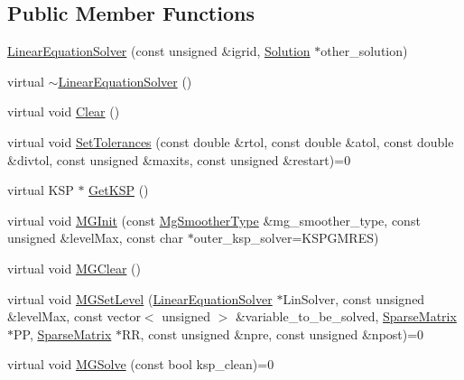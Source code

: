 \subsection*{Public Member Functions}
\begin{DoxyCompactItemize}
\item 
\mbox{\hyperlink{classfemus_1_1_linear_equation_solver_afa8a2758d8652ab34789d9e9d06251fa}{Linear\+Equation\+Solver}} (const unsigned \&igrid, \mbox{\hyperlink{classfemus_1_1_solution}{Solution}} $\ast$other\+\_\+solution)
\item 
virtual \mbox{\hyperlink{classfemus_1_1_linear_equation_solver_aabf62de40b3bc08e5f900130ff341530}{$\sim$\+Linear\+Equation\+Solver}} ()
\item 
virtual void \mbox{\hyperlink{classfemus_1_1_linear_equation_solver_a81ebc19b503dbfc0620f2ca80c1406fa}{Clear}} ()
\item 
virtual void \mbox{\hyperlink{classfemus_1_1_linear_equation_solver_a84b5077395317b5e7201652a68aecb94}{Set\+Tolerances}} (const double \&rtol, const double \&atol, const double \&divtol, const unsigned \&maxits, const unsigned \&restart)=0
\item 
virtual K\+SP $\ast$ \mbox{\hyperlink{classfemus_1_1_linear_equation_solver_a6afe565c3fe3603d79c53529c61f7871}{Get\+K\+SP}} ()
\item 
virtual void \mbox{\hyperlink{classfemus_1_1_linear_equation_solver_a242c687c8b057b1da3136300d530b31e}{M\+G\+Init}} (const \mbox{\hyperlink{_mg_type_enum_8hpp_aec11e12c1f11a6ad959d3280ae0ee9a8}{Mg\+Smoother\+Type}} \&mg\+\_\+smoother\+\_\+type, const unsigned \&level\+Max, const char $\ast$outer\+\_\+ksp\+\_\+solver=K\+S\+P\+G\+M\+R\+ES)
\item 
virtual void \mbox{\hyperlink{classfemus_1_1_linear_equation_solver_a66b4dbef5f62eef5619e4ea4e0b794bf}{M\+G\+Clear}} ()
\item 
virtual void \mbox{\hyperlink{classfemus_1_1_linear_equation_solver_a5ca4fcb7b061968e6ff0ae6a8e496ccd}{M\+G\+Set\+Level}} (\mbox{\hyperlink{classfemus_1_1_linear_equation_solver}{Linear\+Equation\+Solver}} $\ast$Lin\+Solver, const unsigned \&level\+Max, const vector$<$ unsigned $>$ \&variable\+\_\+to\+\_\+be\+\_\+solved, \mbox{\hyperlink{classfemus_1_1_sparse_matrix}{Sparse\+Matrix}} $\ast$PP, \mbox{\hyperlink{classfemus_1_1_sparse_matrix}{Sparse\+Matrix}} $\ast$RR, const unsigned \&npre, const unsigned \&npost)=0
\item 
virtual void \mbox{\hyperlink{classfemus_1_1_linear_equation_solver_a6233a9978c862c966e9f7b9b5ab6c95a}{M\+G\+Solve}} (const bool ksp\+\_\+clean)=0

\end{DoxyCompactItemize}

